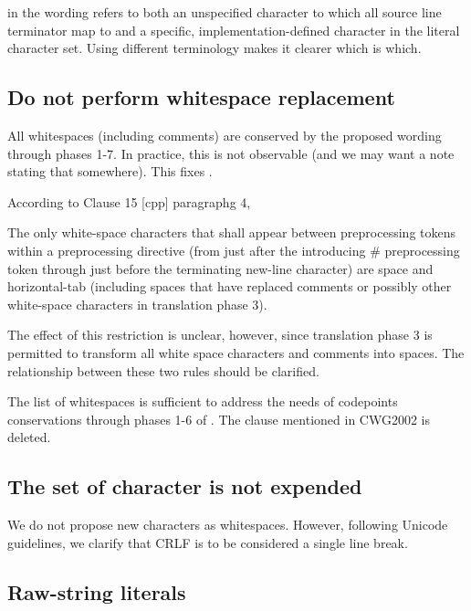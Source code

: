 \documentclass{wg21}
\begin{document}
 in the wording refers to both an unspecified character to which all source line terminator map to and
a specific, implementation-defined character in the literal character set.
Using different terminology makes it clearer which is which.

\subsection{Do not perform whitespace replacement}

All whitespaces (including comments) are conserved by the proposed wording through phases 1-7.
In practice, this is not observable (and we may want a note stating that somewhere).
This fixes .

\begin{quoteblock}
According to Clause 15 [cpp] paragraphg 4,

\begin{quoteblock}
The only white-space characters that shall appear between preprocessing tokens within a preprocessing directive (from just after the introducing \# preprocessing token through just before the terminating new-line character) are space and horizontal-tab (including spaces that have replaced comments or possibly other white-space characters in translation phase 3).
\end{quoteblock}
The effect of this restriction is unclear, however, since translation phase 3 is permitted to transform all white space characters and comments into spaces. The relationship between these two rules should be clarified.
\end{quoteblock}

The list of whitespaces is sufficient to address the needs of
codepoints conservations through phases 1-6 of .
The clause mentioned in CWG2002 is deleted.

\subsection{The set of character is not expended}

We do not propose new characters as whitespaces.
However, following Unicode guidelines, we clarify that CRLF is to be considered a single line break.

\subsection{Raw-string literals}
\end{document}
